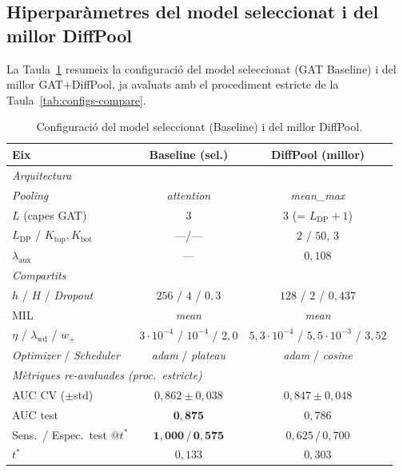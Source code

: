 \documentclass[10pt,a4paper,twocolumn,twoside]{article}
\begin{document}
\subsection{Hiperparàmetres del model seleccionat i del millor DiffPool}
\label{app:best-params}

La Taula~\ref{tab:best-params} resumeix la configuració del model seleccionat (GAT Baseline)
i del millor GAT+DiffPool, ja avaluats amb el procediment estricte de la
Taula~\ref{tab:configs-compare}.

\begin{table}[H]
\centering
\caption{Configuració del model seleccionat (Baseline) i del millor DiffPool.}
\label{tab:best-params}
\small
\begin{tabular}{lcc}
\toprule
\textbf{Eix} & \textbf{Baseline (sel.)} & \textbf{DiffPool (millor)} \\
\midrule
\multicolumn{3}{l}{\textit{Arquitectura}} \\[2pt]
\textit{Pooling}                          & \textit{attention} & \textit{mean\_max} \\
$L$ (capes GAT)                           & $3$ & $3$ (= $L_{\text{DP}}+1$) \\
$L_{\text{DP}}$ / $K_{\text{top}}, K_{\text{bot}}$ & ---/--- & $2$ / $50,\,3$ \\
$\lambda_{\text{aux}}$                    & --- & $0{,}108$ \\
\midrule
\multicolumn{3}{l}{\textit{Compartits}} \\[2pt]
$h$ / $H$ / \textit{Dropout}              & $256$ / $4$ / $0{,}3$ & $128$ / $2$ / $0{,}437$ \\
MIL                                       & \textit{mean} & \textit{mean} \\
$\eta$ / $\lambda_{\text{wd}}$ / $w_+$    & $3\!\cdot\!10^{-4}$ / $10^{-4}$ / $2{,}0$ & $5{,}3\!\cdot\!10^{-4}$ / $5{,}5\!\cdot\!10^{-3}$ / $3{,}52$ \\
\textit{Optimizer} / \textit{Scheduler}   & \textit{adam} / \textit{plateau} & \textit{adam} / \textit{cosine} \\
\midrule
\multicolumn{3}{l}{\textit{Mètriques re-avaluades (proc.\ estricte)}} \\[2pt]
AUC CV ($\pm$std)                         & $0{,}862\!\pm\!0{,}038$ & $0{,}847\!\pm\!0{,}048$ \\
AUC test                                  & $\mathbf{0{,}875}$ & $0{,}786$ \\
Sens.\ / Espec.\ test @$t^*$              & $\mathbf{1{,}000\,/\,0{,}575}$ & $0{,}625\,/\,0{,}700$ \\
$t^*$                                     & $0{,}133$ & $0{,}303$ \\
\bottomrule
\end{tabular}
\end{table}
\end{document}
